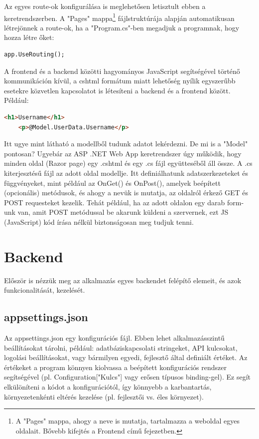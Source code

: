 Az egyes route-ok konfigurálása is meglehetősen letisztult ebben a keretrendszerben. A "Pages" mappa\footnote{A "Pages" mappa, ahogy a neve is mutatja, tartalmazza a weboldal egyes oldalait. Bővebb kifejtés a Frontend című fejezetben.} fájlstruktúrája alapján automatikusan létrejönnek a route-ok, ha a "Program.cs"-ben megadjuk a programnak, hogy hozza létre őket:

\begin{lstlisting}[language={[Sharp]C}]
	app.UseRouting();
\end{lstlisting}

A frontend és a backend közötti hagyományos JavaScript segítségével történő kommunikáción kívül, a cshtml formátum miatt lehetőség nyílik egyszerűbb esetekre közvetlen kapcsolatot is létesíteni a backend és a frontend között. Például:

\begin{lstlisting}[language={HTML}]
	<h1>Username</h1>
	<p>@Model.UserData.Username</p>
\end{lstlisting}

Itt ugye mint látható a modellből tudunk adatot lekérdezni.
De mi is a "Model" pontosan? Ugyebár az ASP .NET Web App keretrendszer úgy működik, hogy minden oldal (Razor page) egy .cshtml és egy .cs fájl együtteséből áll össze. A .cs kiterjesztésű fájl az adott oldal modellje. Itt definiálhatunk adatszerkezeteket és függvényeket, mint például az OnGet() és OnPost(), amelyek beépített (opcionális) metódusok, és ahogy a nevük is mutatja,
az oldalról érkező GET és POST requesteket kezelik. Tehát például,
ha az adott oldalon egy darab form-unk van, amit POST metódussal
be akarunk küldeni a szervernek, ezt JS (JavaScript) kód írása nélkül biztonságosan meg tudjuk tenni.

\section{Backend}

Először is nézzük meg az alkalmazás egyes backendet felépítő elemeit, és azok funkcionalitását, kezelését.

\subsection{appsettings.json}

Az appsettings.json egy konfigurációs
fájl. Ebben lehet alkalmazásszintű beállításokat tárolni, például:
adatbáziskapcsolati stringeket,
API kulcsokat,
logolási beállításokat,
vagy bármilyen egyedi, fejlesztő által definiált értéket.
Az értékeket a program könnyen kiolvassa a beépített konfigurációs
rendszer segítségével (pl. Configuration["Kulcs"] vagy
erősen típusos binding-gel). Ez segít elkülöníteni a kódot a
konfigurációtól, így könnyebb a karbantartás, környezetenkénti
eltérés kezelése (pl. fejlesztői vs. éles környezet).

